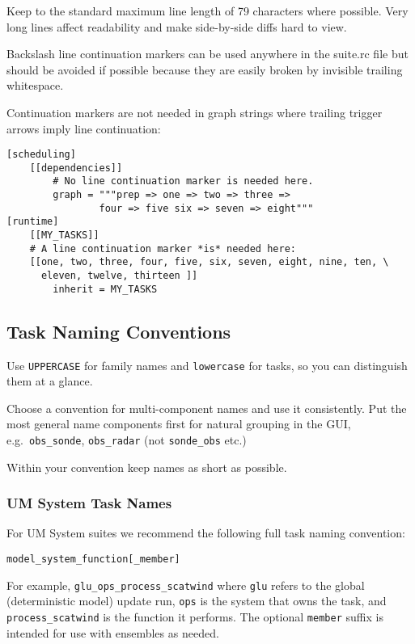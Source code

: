 Keep to the standard maximum line length of 79 characters where possible. Very
long lines affect readability and make side-by-side diffs hard to view.

Backslash line continuation markers can be used anywhere in the suite.rc file
but should be avoided if possible because they are easily broken by invisible
trailing whitespace.

Continuation markers are not needed in graph strings where trailing
trigger arrows imply line continuation:

\lstset{language=suiterc}
\begin{lstlisting}
[scheduling]
    [[dependencies]]
        # No line continuation marker is needed here.
        graph = """prep => one => two => three =>
                four => five six => seven => eight"""
[runtime]
    [[MY_TASKS]]
    # A line continuation marker *is* needed here:
    [[one, two, three, four, five, six, seven, eight, nine, ten, \
      eleven, twelve, thirteen ]]
        inherit = MY_TASKS
\end{lstlisting}

\subsection{Task Naming Conventions}

Use \lstinline=UPPERCASE= for family names and \lstinline=lowercase=
for tasks, so you can distinguish them at a glance.

Choose a convention for multi-component names and use it consistently. Put the
most general name components first for natural grouping in the GUI, e.g.\
\lstinline=obs_sonde=, \lstinline=obs_radar= (not \lstinline=sonde_obs= etc.)

Within your convention keep names as short as possible.

\subsubsection{UM System Task Names}

For UM System suites we recommend the following full task naming convention:

\lstset{language=suiterc}
\begin{lstlisting}
model_system_function[_member]
\end{lstlisting}

For example, \lstinline=glu_ops_process_scatwind= where \lstinline=glu= refers
to the global (deterministic model) update run, \lstinline=ops= is the system
that owns the task, and \lstinline=process_scatwind= is the function it
performs. The optional \lstinline=member= suffix is intended for use with
ensembles as needed.

